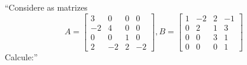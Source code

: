 \enquote{Considere as matrizes
\begin{displaymath}
    A = \left[
        \begin{array}{cccc}
            3 & 0 & 0 & 0 \\
            -2 & 4 & 0 & 0 \\
            0 & 0 & 1 & 0 \\
            2 & -2 & 2 & -2
        \end{array}
    \right],
    B = \left[
        \begin{array}{cccc}
            1 & -2 & 2 & -1 \\
            0 & 2 & 1 & 3 \\
            0 & 0 & 3 & 1 \\
            0 & 0 & 0 & 1
        \end{array}
    \right]
\end{displaymath}
Calcule:}
